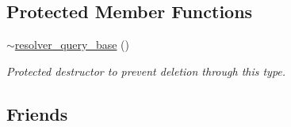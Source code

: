 \subsection*{Protected Member Functions}
\begin{DoxyCompactItemize}
\item 
\hyperlink{classasio_1_1ip_1_1resolver__query__base_a904f8e49d1471e7a21e4a9b54ea44846}{$\sim$resolver\+\_\+query\+\_\+base} ()
\begin{DoxyCompactList}\small\item\em Protected destructor to prevent deletion through this type. \end{DoxyCompactList}\end{DoxyCompactItemize}
\subsection*{Friends}
